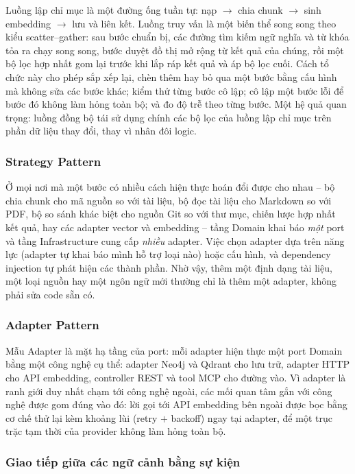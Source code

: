 Luồng lập chỉ mục là một đường ống tuần tự: nạp $\rightarrow$ chia chunk $\rightarrow$ sinh embedding $\rightarrow$ lưu và liên kết. Luồng truy vấn là một biến thể song song theo kiểu scatter--gather: sau bước chuẩn bị, các đường tìm kiếm ngữ nghĩa và từ khóa tỏa ra chạy song song, bước duyệt đồ thị mở rộng từ kết quả của chúng, rồi một bộ lọc hợp nhất gom lại trước khi lắp ráp kết quả và áp bộ lọc cuối. Cách tổ chức này cho phép sắp xếp lại, chèn thêm hay bỏ qua một bước bằng cấu hình mà không sửa các bước khác; kiểm thử từng bước cô lập; cô lập một bước lỗi để bước đó không làm hỏng toàn bộ; và đo độ trễ theo từng bước. Một hệ quả quan trọng: luồng đồng bộ tái sử dụng chính các bộ lọc của luồng lập chỉ mục trên phần dữ liệu thay đổi, thay vì nhân đôi logic.

\subsubsection{Strategy Pattern}

Ở mọi nơi mà một bước có nhiều cách hiện thực hoán đổi được cho nhau -- bộ chia chunk cho mã nguồn so với tài liệu, bộ đọc tài liệu cho Markdown so với PDF, bộ so sánh khác biệt cho nguồn Git so với thư mục, chiến lược hợp nhất kết quả, hay các adapter vector và embedding -- tầng Domain khai báo \textit{một} port và tầng Infrastructure cung cấp \textit{nhiều} adapter. Việc chọn adapter dựa trên năng lực (adapter tự khai báo mình hỗ trợ loại nào) hoặc cấu hình, và dependency injection tự phát hiện các thành phần. Nhờ vậy, thêm một định dạng tài liệu, một loại nguồn hay một ngôn ngữ mới thường chỉ là thêm một adapter, không phải sửa code sẵn có.

\subsubsection{Adapter Pattern}

Mẫu Adapter là mặt hạ tầng của port: mỗi adapter hiện thực một port Domain bằng một công nghệ cụ thể: adapter Neo4j và Qdrant cho lưu trữ, adapter HTTP cho API embedding, controller REST và tool MCP cho đường vào. Vì adapter là ranh giới duy nhất chạm tới công nghệ ngoài, các mối quan tâm gắn với công nghệ được gom đúng vào đó: lời gọi tới API embedding bên ngoài được bọc bằng cơ chế thử lại kèm khoảng lùi (retry $+$ backoff) ngay tại adapter, để một trục trặc tạm thời của provider không làm hỏng toàn bộ.

\subsubsection{Giao tiếp giữa các ngữ cảnh bằng sự kiện}

